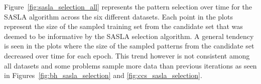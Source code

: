 \documentclass[conference]{IEEEtran}
\begin{document}
	Figure~\ref{fig:sasla_selection_all} represents the pattern selection over time for the SASLA algorithm across the six different datasets. Each point in the plots represent the size of the sampled training set from the candidate set that was deemed to be informative by the SASLA selection algorithm. A general tendency is seen in the plots where the size of the sampled patterns from the candidate set decreased over time for each epoch. This trend however is not consistent among all datasets and some problems sample more data than previous iterations as seen in Figures~\ref{fig:bh_sasla_selection} and \ref{fig:ccs_sasla_selection}. 
	\begin{figure}[htbp]
		\centering
		\hfil
		
		\hfil
		

\end{figure}
\end{document}
